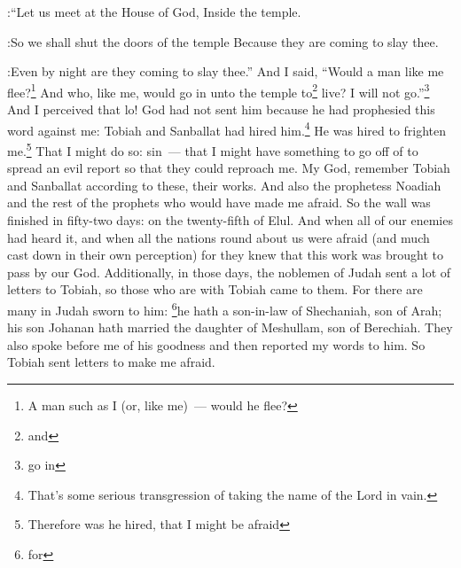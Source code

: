 \begin{enumerate}[align=center]
:``Let us meet at the House of God, Inside the temple.

:So we shall shut the doors of the temple Because they are coming to slay thee.

:Even by night are they coming to slay thee.''%
     And I said, ``Would a man like me flee?\footnote{A man such as I (or, like me)~--- would he flee?} And who, like me, would go in unto the temple to\footnote{and} live? I will not go.''\footnote{go in}%
     And I perceived that lo! God had not sent him because he had prophesied this word against me: Tobiah and Sanballat had hired him.\footnote{That's some serious transgression of taking the name of the Lord in vain.}%
     He was hired to frighten me.\footnote{Therefore was he hired, that I might be afraid} That I might do so: sin~--- that I might have something to go off of to spread an evil report so that they could reproach me.%
     My God, remember Tobiah and Sanballat according to these, their works. And also the prophetess Noadiah and the rest of the prophets who would have made me afraid.%
     So the wall was finished in fifty-two days: on the twenty-fifth of Elul.%
     And when all of our enemies had heard it, and when all the nations round about us were afraid (and much cast down in their own perception) for they knew that this work was brought to pass by our God.%
     Additionally, in those days, the noblemen of Judah sent a lot of letters to Tobiah, so those who are with Tobiah came to them.%
     For there are many in Judah sworn to him: \footnote{for}he hath a son-in-law of Shechaniah, son of Arah; his son Johanan hath married the daughter of Meshullam, son of Berechiah.%
     They also spoke before me of his goodness and then reported my words to him. So Tobiah sent letters to make me afraid.%
\end{enumerate}
